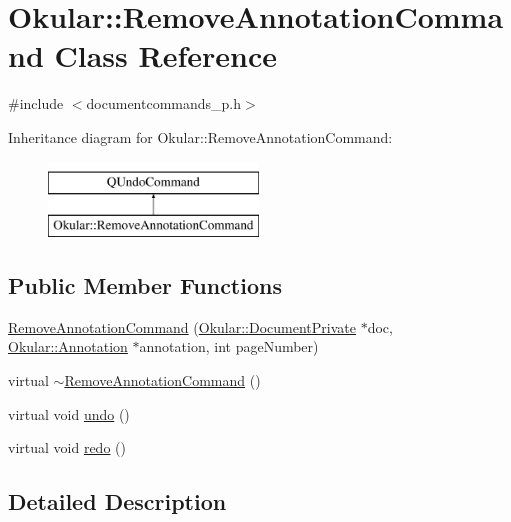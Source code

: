\hypertarget{classOkular_1_1RemoveAnnotationCommand}{\section{Okular\+:\+:Remove\+Annotation\+Command Class Reference}
\label{classOkular_1_1RemoveAnnotationCommand}
}


{\ttfamily \#include $<$documentcommands\+\_\+p.\+h$>$}

Inheritance diagram for Okular\+:\+:Remove\+Annotation\+Command\+:\begin{figure}[H]
\begin{center}
\leavevmode
\includegraphics[height=2.000000cm]{classOkular_1_1RemoveAnnotationCommand}
\end{center}
\end{figure}
\subsection*{Public Member Functions}
\begin{DoxyCompactItemize}
\item 
\hyperlink{classOkular_1_1RemoveAnnotationCommand_afae53ca780ed1b912d062d5ef6a2adaf}{Remove\+Annotation\+Command} (\hyperlink{classOkular_1_1DocumentPrivate}{Okular\+::\+Document\+Private} $\ast$doc, \hyperlink{classOkular_1_1Annotation}{Okular\+::\+Annotation} $\ast$annotation, int page\+Number)
\item 
virtual \hyperlink{classOkular_1_1RemoveAnnotationCommand_a9edd75f4c4ea6c339dfb25bb44182016}{$\sim$\+Remove\+Annotation\+Command} ()
\item 
virtual void \hyperlink{classOkular_1_1RemoveAnnotationCommand_aafc8d02122ce0ad625e28b6ed26850c9}{undo} ()
\item 
virtual void \hyperlink{classOkular_1_1RemoveAnnotationCommand_a7fa570db25ec3087c4b8dfa26a78708b}{redo} ()
\end{DoxyCompactItemize}


\subsection{Detailed Description}


